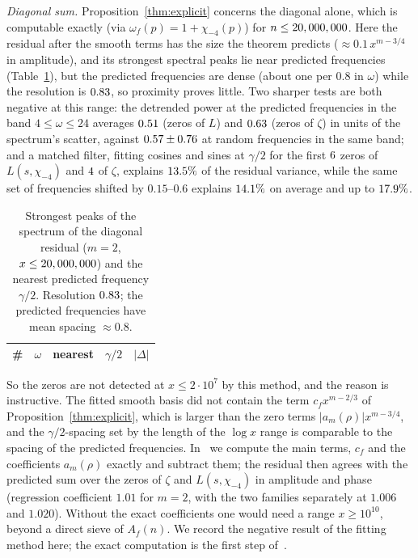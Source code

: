 \documentclass[11pt,a4paper]{article}
\theoremstyle{remark}\newtheorem{remark}[theorem]{Remark}
\begin{document}
\emph{Diagonal sum.} Proposition~\ref{thm:explicit} concerns the diagonal alone, which is computable
exactly (via $\omega_f(p)=1+\chi_{-4}(p)$) for $n\le20,000,000$. Here the residual after the smooth terms has
the size the theorem predicts ($\approx0.1\,x^{m-3/4}$ in amplitude), and its strongest spectral peaks
lie near predicted frequencies (Table~\ref{tab:rieszd}), but the predicted frequencies are dense
(about one per $0.8$ in $\omega$) while the resolution is $0.83$, so proximity proves little. Two
sharper tests are both negative at this range: the detrended power at the predicted frequencies in the
band $4\le\omega\le24$ averages $0.51$ (zeros of $L$) and $0.63$ (zeros of $\zeta$) in units of the
spectrum's scatter, against $0.57\pm0.76$ at random frequencies in the same band; and a matched
filter, fitting cosines and sines at $\gamma/2$ for the first $6$ zeros of $L(s,\chi_{-4})$ and
$4$ of $\zeta$, explains $13.5\%$ of the residual variance, while the same set of frequencies
shifted by $0.15$--$0.6$ explains $14.1\%$ on average and up to $17.9\%$.

\begin{table}[htbp]
\centering\small
\caption{Strongest peaks of the spectrum of the diagonal residual ($m=2$, $x\le20,000,000$) and the nearest
predicted frequency $\gamma/2$. Resolution $0.83$; the predicted frequencies have mean spacing $\approx0.8$.}
\label{tab:rieszd}
\begin{tabular}{rrlrr}
\toprule
\# & $\omega$ & nearest & $\gamma/2$ & $|\Delta|$\\
\midrule

\end{tabular}
\end{table}

So the zeros are not detected at $x\le2\cdot10^7$ by this method, and the reason is instructive. The
fitted smooth basis did not contain the term $c_fx^{m-2/3}$ of Proposition~\ref{thm:explicit}, which is
larger than the zero terms $|a_m(\rho)|x^{m-3/4}$, and the $\gamma/2$-spacing set by the length of the
$\log x$ range is comparable to the spacing of the predicted frequencies. In~\cite{ReichardtII} we compute the
main terms, $c_f$ and the coefficients $a_m(\rho)$ exactly and subtract them; the residual then agrees
with the predicted sum over the zeros of $\zeta$ and $L(s,\chi_{-4})$ in amplitude and phase (regression
coefficient $1.01$ for $m=2$, with the two families separately at $1.006$ and $1.020$). Without the exact coefficients one would need a range
$x\ge10^{10}$, beyond a direct sieve of $A_f(n)$. We record the negative result of the fitting method
here; the exact computation is the first step of~\cite{ReichardtII}.
\end{document}

